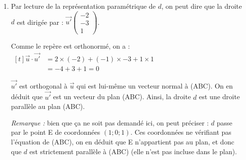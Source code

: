 \documentclass[10pt]{article}
\providecommand{\vect}[1]{\overrightarrow{#1}}
\begin{document}
\begin{enumerate}
	\item Par lecture de la représentation paramétrique de $d$, on peut dire que la droite $d$ est dirigée par : $\vect{u'}\begin{pmatrix} -2 \\ -3 \\ 1\end{pmatrix}$.

	Comme le repère est orthonormé, on a :\quad $\begin{aligned}[t]
		\vect{u} \cdot \vect{u'} &= 2 \times (-2) + (- 1) \times -3 + 1  \times 1\\
		& = -4 + 3 + 1 = 0
	\end{aligned}$

	$\vect{u'}$ est orthogonal à $\vect{u}$ qui est lui-même un vecteur normal à (ABC). On en déduit que $\vect{u'}$ est un vecteur du plan (ABC). Ainsi, la droite $d$ est une droite parallèle au plan (ABC).

	\emph{Remarque :} bien que ça ne soit pas demandé ici, on peut préciser : $d$ passe par le point E de coordonnées $(1 ; 0 ; 1)$. Ces coordonnées ne vérifiant pas l'équation de (ABC), on en déduit que E n'appartient pas au plan, et donc que $d$ est strictement parallèle à (ABC) (elle n'est pas incluse dans le plan).
	\end{enumerate}
\end{document}
